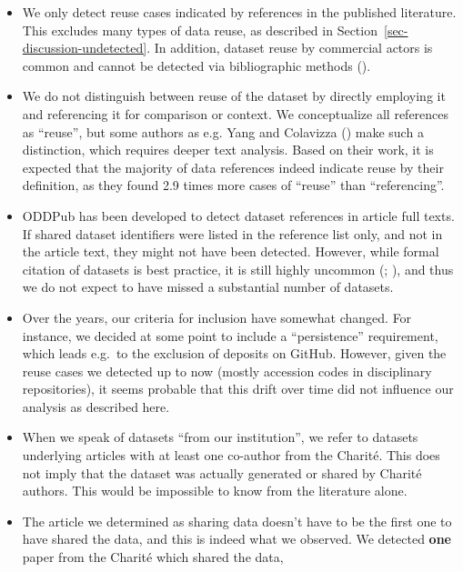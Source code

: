 \documentclass[
  letterpaper,
  DIV=11,
  numbers=noendperiod]{scrartcl}
\begin{document}
\begin{itemize}
\item
  We only detect reuse cases indicated by references in the published
  literature. This excludes many types of data reuse, as described in
  Section~\ref{sec-discussion-undetected}. In addition, dataset reuse by
  commercial actors is common and cannot be detected via bibliographic
  methods ().
\item
  We do not distinguish between reuse of the dataset by directly
  employing it and referencing it for comparison or context. We
  conceptualize all references as ``reuse'', but some authors as e.g.
  Yang and Colavizza
  () make such a
  distinction, which requires deeper text analysis. Based on their work,
  it is expected that the majority of data references indeed indicate
  reuse by their definition, as they found 2.9 times more cases of
  ``reuse'' than ``referencing''.
\item
  ODDPub has been developed to detect dataset references in article full
  texts. If shared dataset identifiers were listed in the reference list
  only, and not in the article text, they might not have been detected.
  However, while formal citation of datasets is best practice, it is
  still highly uncommon (;
  ), and thus we do
  not expect to have missed a substantial number of datasets.
\item
  Over the years, our criteria for inclusion have somewhat changed. For
  instance, we decided at some point to include a ``persistence''
  requirement, which leads e.g.~to the exclusion of deposits on GitHub.
  However, given the reuse cases we detected up to now (mostly accession
  codes in disciplinary repositories), it seems probable that this drift
  over time did not influence our analysis as described here.
\item
  When we speak of datasets ``from our institution'', we refer to
  datasets underlying articles with at least one co-author from the
  Charité. This does not imply that the dataset was actually generated
  or shared by Charité authors. This would be impossible to know from
  the literature alone.
\item
  The article we determined as sharing data doesn't have to be the first
  one to have shared the data, and this is indeed what we observed. We
  detected \textbf{one} paper from the Charité which shared the data,

\end{itemize}
\end{document}
